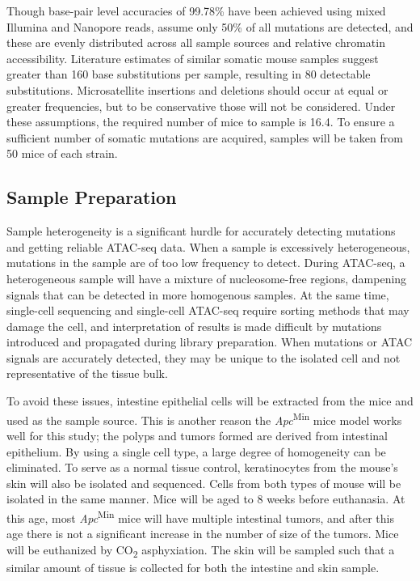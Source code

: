 Though base-pair level accuracies of 99.78\% have been achieved using mixed Illumina and Nanopore reads, assume only 50\% of all mutations are detected, and these are evenly distributed across all sample sources and relative chromatin accessibility. Literature estimates \parencite{behjati_genome_2014} of similar somatic mouse samples suggest greater than 160 base substitutions per sample, resulting in 80 detectable substitutions. Microsatellite insertions and deletions should occur at equal or greater frequencies, but to be conservative those will not be considered. Under these assumptions, the required number of mice to sample is 16.4. To ensure a sufficient number of somatic mutations are acquired, samples will be taken from 50 mice of each strain.


\subsection{Sample Preparation}

Sample heterogeneity is a significant hurdle for accurately detecting mutations and getting reliable ATAC-seq data. When a sample is excessively heterogeneous, mutations in the sample are of too low frequency to detect. During ATAC-seq, a heterogeneous sample will have a mixture of nucleosome-free regions, dampening signals that can be detected in more homogenous samples. At the same time, single-cell sequencing and single-cell ATAC-seq require sorting methods that may damage the cell, and interpretation of results is made difficult by mutations introduced and propagated during library preparation. When mutations or ATAC signals are accurately detected, they may be unique to the isolated cell and not representative of the tissue bulk.

To avoid these issues, intestine epithelial cells will be extracted from the mice and used as the sample source. This is another reason the \textit{Apc}\textsuperscript{Min} mice model works well for this study; the polyps and tumors formed are derived from intestinal epithelium. By using a single cell type, a large degree of homogeneity can be eliminated. To serve as a normal tissue control, keratinocytes from the mouse's skin will also be isolated and sequenced. Cells from both types of mouse will be isolated in the same manner. Mice will be aged to 8 weeks before euthanasia. At this age, most \textit{Apc}\textsuperscript{Min} mice will have multiple intestinal tumors, and after this age there is not a significant increase in the number of size of the tumors. Mice will be euthanized by CO\textsubscript{2} asphyxiation. The skin will be sampled such that a similar amount of tissue is collected for both the intestine and skin sample.

